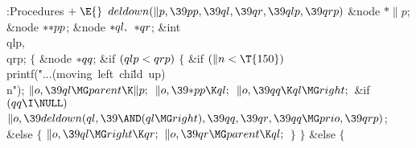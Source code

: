 \B{}:Procedures\X${}\mathrel+\E{}$\6
$\\{deldown}(\|p,\39\\{pp},\39\\{ql},\39\\{qr},\39\\{qlp},\39\\{qrp}){}$\1\1\6
\&{node} ${}{*}\|p{}$;\6
\&{node} ${}{*}{*}\\{pp}{}$;\6
\&{node} ${}{*}\\{ql},{}$ ${}{*}\\{qr}{}$;\6
\&{int} \\{qlp}${},{}$ \\{qrp};\2\2\6
${}\{{}$\5
\1\&{node} ${}{*}\\{qq}{}$;\7
\&{if} ${}(\\{qlp}<\\{qrp}){}$\5
${}\{{}$\1\6
\&{if} ${}(\|n<\T{150}){}$\1\5
\\{printf}(\.{"...(moving\ left\ chi}\)\.{ld\ up)\\n"});\2\6
${}\|o,\39\\{ql}\MG\\{parent}\K\|p;{}$\6
${}\|o,\39{*}\\{pp}\K\\{ql};{}$\6
${}\|o,\39\\{qq}\K\\{ql}\MG\\{right};{}$\6
\&{if} ${}(\\{qq}\I\NULL){}$\1\5
${}\|o,\39\\{deldown}(\\{ql},\39{\AND}(\\{ql}\MG\\{right}),\39\\{qq},\39\\{qr},%
\39\\{qq}\MG\\{prio},\39\\{qrp}){}$;\2\6
\&{else}\5
${}\{{}$\1\6
${}\|o,\39\\{ql}\MG\\{right}\K\\{qr};{}$\6
${}\|o,\39\\{qr}\MG\\{parent}\K\\{ql};{}$\6
\4${}\}{}$\2\6
\4${}\}{}$\2\6
\&{else}\5
${}\{{}$\1\6
